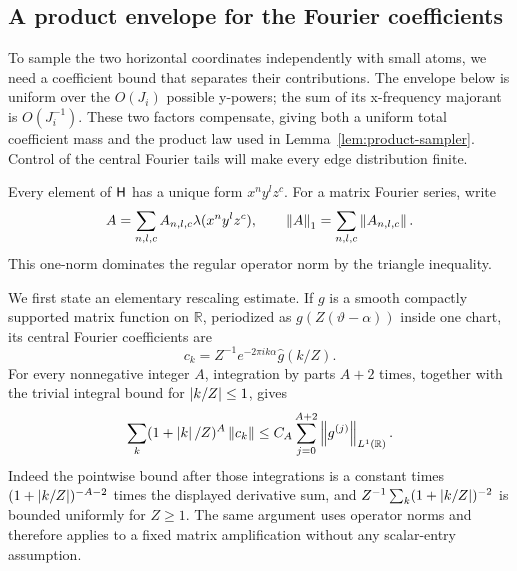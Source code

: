 \subsection{A product envelope for the Fourier coefficients}

To sample the two horizontal coordinates independently with small atoms, we
need a coefficient bound that separates their contributions.  The envelope
below is uniform over the \(O(J_i)\) possible y-powers; the sum of its
x-frequency majorant is \(O(J_i^{-1})\).  These two factors compensate,
giving both a uniform total coefficient mass and the product law used in
Lemma~\ref{lem:product-sampler}.  Control of the central Fourier tails will
make every edge distribution finite.

Every element of \(\mathsf H\) has a unique form \(x^ny^lz^c\).  For a matrix
Fourier series, write
\[
 A=\sum_{n,l,c}A_{n,l,c}\lambda(x^ny^lz^c),\qquad
 \left\lVert A\right\rVert_1=\sum_{n,l,c}\left\lVert A_{n,l,c}\right\rVert.
\]
This one-norm dominates the
regular operator norm by the triangle inequality.

We first state an elementary rescaling estimate.  If \(g\) is a smooth compactly
supported matrix function on \(\mathbb R\), periodized as
\(g(Z(\vartheta-\alpha))\) inside one chart, its central Fourier coefficients
are
\[
 c_k=Z^{-1}e^{-2\pi i k\alpha}\widehat g(k/Z).
\]
For every nonnegative integer \(A\), integration by parts \(A+2\) times,
together with the trivial integral bound for \(\left\lvert k/Z\right\rvert\leq1\), gives
\begin{equation}
\label{eq:rescaled-fourier-estimate}
 \sum_k(1+\left\lvert k\right\rvert/Z)^A\left\lVert c_k\right\rVert
 \leq C_A\sum_{j=0}^{A+2}\left\lVert g^{(j)}\right\rVert_{L^1(\mathbb R)}.
\end{equation}
Indeed the pointwise bound after those integrations is a constant times
\((1+\left\lvert k/Z\right\rvert)^{-A-2}\) times the displayed derivative sum, and
\(Z^{-1}\sum_k(1+\left\lvert k/Z\right\rvert)^{-2}\) is bounded uniformly for \(Z\geq1\).
The same argument uses operator norms and therefore applies to a fixed matrix
amplification without any scalar-entry assumption.

